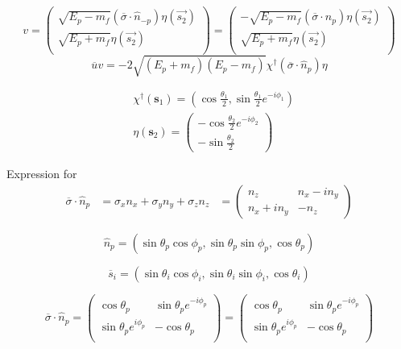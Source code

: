 \documentclass[12pt]{article}
\begin{document}
	\[
	v =
	\begin{pmatrix}
		\sqrt{E_p - m_f} (\overline{\sigma} \cdot \hat{n}_{-p}) \eta(\vec{s_2})\\
		\sqrt{E_p + m_f} \eta(\vec{s_2})\\
	\end{pmatrix}
	=
	\begin{pmatrix}
		-\sqrt{E_p - m_f} (\overline{\sigma} \cdot \hat{n}_p) \eta(\vec{s_2})\\
		\sqrt{E_p + m_f} \eta(\vec{s_2})\\
	\end{pmatrix}
	\]
    \[
    \overline{u} v = - 2 \sqrt{(E_p + m_f)(E_p - m_f)} \chi^{\dagger} (\overline{\sigma} \cdot \hat{n}_p) \eta
    \]
    
    \[
    \begin{aligned}
    &\chi^{\dagger} (\bm{s}_1) = (\cos \frac{\theta_1}{2}, \sin \frac{\theta_1}{2} e^{-i \phi_1}) \\ 
    &\eta(\bm{s}_2) = 
    \begin{pmatrix}
		- \cos \frac{\theta_2}{2} e^{-i \phi_2}\\
		- \sin \frac{\theta_2}{2} 
	\end{pmatrix}
    \end{aligned}
    \]
    
    Expression for 
    \[
    \begin{aligned}
    \overline{\sigma} \cdot \hat{n}_p &= \sigma_x n_x + \sigma_y n_y + \sigma_z n_z 
    &= 
    \begin{pmatrix}
    	n_z & n_x - i n_y \\
    	n_x + i n_y & -n_z
    \end{pmatrix}
    \end{aligned}
    \]
    
    \[
    \hat{n}_p = (\sin \theta_{p} \cos \phi_p, \sin \theta_p \sin \phi_p, \cos \theta_p)
    \]
    
    \[
    \overline{s}_i = (\sin \theta_i \cos \phi_i, \sin \theta_i \sin \phi_i, \cos \theta_i)
    \]
    
    \[
    \overline{\sigma} \cdot \hat{n}_p = 
     \begin{pmatrix}
    	\cos \theta_p & \sin \theta_p e^{-i \phi_p} \\
    	\sin \theta_p e^{i \phi_p} & - \cos \theta_p \\
    \end{pmatrix}
    =
    \begin{pmatrix}
    	\cos \theta_p & \sin \theta_p e^{-i \phi_p} \\
    	\sin \theta_p e^{i \phi_p} & - \cos \theta_p \\
    \end{pmatrix}
    \]
\end{document}
